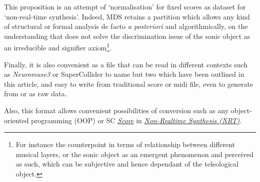 This proposition is an attempt of `normalisation' for fixed scores as dataset for `non-real-time synthesis'. Indeed, MDS retains a partition which allows any kind of structural or formal analysis de facto \textit{a posteriori} and algorithmically, on the understanding that does not solve the discrimination issue of the sonic object as an irreducible and signifier axiom\footnote{For instance the counterpoint in terms of relationship between different musical layers, or the sonic object as an emergent phenomenon and perceived as such, which can be subjective and hence dependant of the teleological object.}. 

\bigskip 

Finally, it is also convenient as a file that can be read in different contexts such as  \textsl{Neuromuse3} or SuperCollider to name but two which have been outlined in this article, and easy to write from traditional score or midi file, even to generate from or as raw data.

Also, this format allows convenient possibilities of conversion such as any object-oriented programming (OOP) or SC \href{http://doc.sccode.org/Classes/Score.html}{\textit{Score}} in \href{http://doc.sccode.org/Guides/Non-Realtime-Synthesis.html}{\textit{Non-Realtime Synthesis (NRT)}}.





